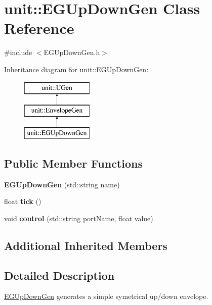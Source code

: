 \hypertarget{classunit_1_1EGUpDownGen}{}\section{unit\+:\+:E\+G\+Up\+Down\+Gen Class Reference}
\label{classunit_1_1EGUpDownGen}


{\ttfamily \#include $<$E\+G\+Up\+Down\+Gen.\+h$>$}

Inheritance diagram for unit\+:\+:E\+G\+Up\+Down\+Gen\+:\begin{figure}[H]
\begin{center}
\leavevmode
\includegraphics[height=3.000000cm]{classunit_1_1EGUpDownGen}
\end{center}
\end{figure}
\subsection*{Public Member Functions}
\begin{DoxyCompactItemize}
\item 
{\bfseries E\+G\+Up\+Down\+Gen} (std\+::string name)\hypertarget{classunit_1_1EGUpDownGen_abc35a572da36fa26f4b54beabfc6268e}{}\label{classunit_1_1EGUpDownGen_abc35a572da36fa26f4b54beabfc6268e}

\item 
float {\bfseries tick} ()\hypertarget{classunit_1_1EGUpDownGen_abea11de5389345064a8395d54411e3b3}{}\label{classunit_1_1EGUpDownGen_abea11de5389345064a8395d54411e3b3}

\item 
void {\bfseries control} (std\+::string port\+Name, float value)\hypertarget{classunit_1_1EGUpDownGen_ac1ef59d9023034c17b46e09bfae15178}{}\label{classunit_1_1EGUpDownGen_ac1ef59d9023034c17b46e09bfae15178}

\end{DoxyCompactItemize}
\subsection*{Additional Inherited Members}


\subsection{Detailed Description}
\hyperlink{classunit_1_1EGUpDownGen}{E\+G\+Up\+Down\+Gen} generates a simple symetrical up/down envelope.

